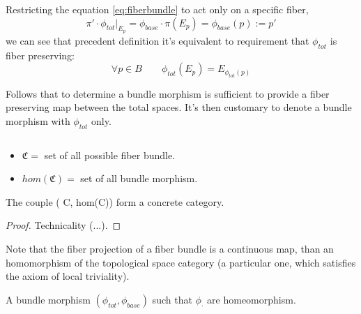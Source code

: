 \documentclass[a4paper,12pt]{scrartcl}    %
\begin{document}
\begin{observation}
Restricting the equation \eqref{eq:fiberbundle} to act only on a specific fiber,
\begin{displaymath}
\pi' \cdot \phi_{tot} \vert_{E_{p}} = \phi_{base} \cdot \pi (E_{p}) = \phi_{base}(p) := p'
\end{displaymath}
we can see that precedent definition it's equivalent to requirement that $\phi_{tot}$ is fiber preserving:
\begin{displaymath}
\forall p \in B \qquad \phi_{tot}(E_{p}) = E_{\phi_{tot}(p)}
\end{displaymath}

Follows that to determine a bundle morphism is sufficient to provide a fiber preserving map between the total spaces. It's then customary to denote a bundle morphism with $\phi_{tot}$ only.
\end{observation}

\begin{proposition}
$$ $$
	\begin{hypothesis}
			\begin{itemize}
				\item $\mathfrak{C} = $ set of all possible fiber bundle.
				\item $hom(\mathfrak{C}) = $ set of all bundle morphism.
			\end{itemize}
	\end{hypothesis}
	\begin{thesis}
				The couple ( C, hom(C)) form a concrete category.
	\end{thesis}
\end{proposition}
\begin{proof}
Technicality (...).
\end{proof}

\begin{observation}
Note that the fiber projection of a fiber bundle is a continuous map, than an homomorphism of the topological space category (a particular one, which satisfies the axiom of local triviality).
\end{observation}

\begin{definition}
A bundle morphism $(\phi_{tot}, \phi_{base})$ such that $\phi_{\cdot}$ are homeomorphism.
\end{definition}
\end{document}
